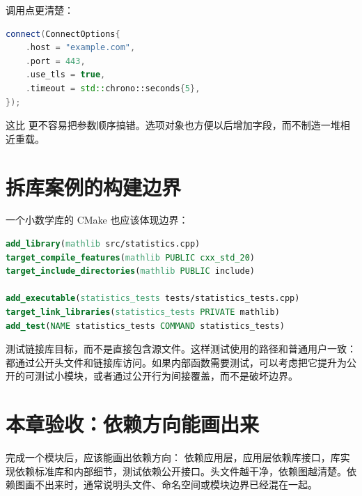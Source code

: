 调用点更清楚：

\begin{lstlisting}[language=C++,caption={具名字段调用}]
connect(ConnectOptions{
    .host = "example.com",
    .port = 443,
    .use_tls = true,
    .timeout = std::chrono::seconds{5},
});
\end{lstlisting}

这比  更不容易把参数顺序搞错。选项对象也方便以后增加字段，而不制造一堆相近重载。

\section{拆库案例的构建边界}

一个小数学库的 CMake 也应该体现边界：

\begin{lstlisting}[language=cmake,caption={小库目标和测试目标}]
add_library(mathlib src/statistics.cpp)
target_compile_features(mathlib PUBLIC cxx_std_20)
target_include_directories(mathlib PUBLIC include)

add_executable(statistics_tests tests/statistics_tests.cpp)
target_link_libraries(statistics_tests PRIVATE mathlib)
add_test(NAME statistics_tests COMMAND statistics_tests)
\end{lstlisting}

测试链接库目标，而不是直接包含源文件。这样测试使用的路径和普通用户一致：都通过公开头文件和链接库访问。如果内部函数需要测试，可以考虑把它提升为公开的可测试小模块，或者通过公开行为间接覆盖，而不是破坏边界。

\section{本章验收：依赖方向能画出来}

完成一个模块后，应该能画出依赖方向： 依赖应用层，应用层依赖库接口，库实现依赖标准库和内部细节，测试依赖公开接口。头文件越干净，依赖图越清楚。依赖图画不出来时，通常说明头文件、命名空间或模块边界已经混在一起。
